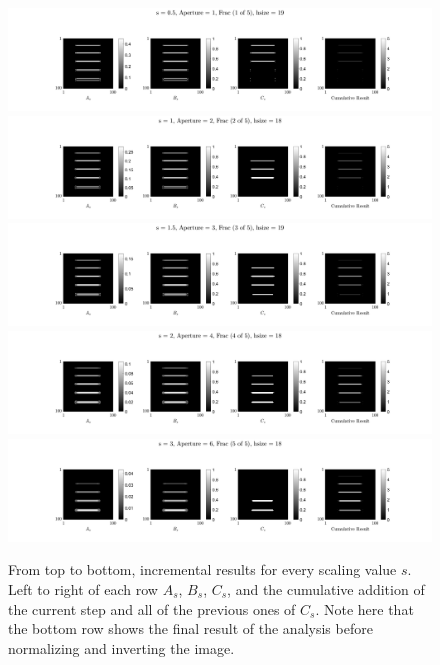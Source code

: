 \documentclass{edger}
\begin{document}
\begin{figure}[!h]
\centering
\includegraphics[width = \textwidth]{"SFI,s = 0.5, Aperture = 1, Frac (1 of 5), hsize = 19"}
\includegraphics[width = \textwidth]{"SFI,s = 1, Aperture = 2, Frac (2 of 5), hsize = 18"}
\includegraphics[width = \textwidth]{"SFI,s = 1.5, Aperture = 3, Frac (3 of 5), hsize = 19"}
\includegraphics[width = \textwidth]{"SFI,s = 2, Aperture = 4, Frac (4 of 5), hsize = 18"}
\includegraphics[width = \textwidth]{"SFI,s = 3, Aperture = 6, Frac (5 of 5), hsize = 18"}
\caption{From top to bottom, incremental results for every scaling value $s$. Left to right of each row $A_s$, $B_s$, $C_s$, and the cumulative addition of the current step and all of the previous ones of $C_s$. Note here that the bottom row shows the final result of the analysis before normalizing and inverting the image. }
\label{fig:Fracture Mapping Analysis}
\end{figure}
\end{document}
